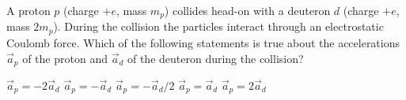 \begin{questions}\setcounter{question}{31}\question
A proton $p$ (charge $+e$, mass $m_{p}$) collides head-on with a deuteron $d$ (charge $+e$, mass $2 m_{p}$). During the collision the particles interact through an electrostatic Coulomb force. Which of the following statements is true about the accelerations $\vec{a}_{p}$ of the proton and $\vec{a}_{d}$ of the deuteron during the collision?

\begin{oneparchoices}
\choice $\vec{a}_{p}=-2 \vec{a}_{d}$
\choice $\vec{a}_{p}=-\vec{a}_{d}$
\choice $\vec{a}_{p}=-\vec{a}_{d} / 2$
\choice $\vec{a}_{p}=\vec{a}_{d}$
\choice $\vec{a}_{p}=2 \vec{a}_{d}$
\end{oneparchoices}\end{questions}

